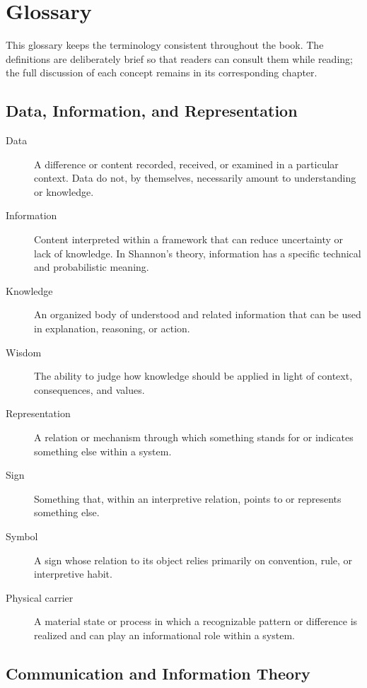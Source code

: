 \chapter*{Glossary}

This glossary keeps the terminology consistent throughout the book. The definitions are deliberately brief so that readers can consult them while reading; the full discussion of each concept remains in its corresponding chapter.

\section*{Data, Information, and Representation}

\begin{description}
  \item[Data] A difference or content recorded, received, or examined in a particular context. Data do not, by themselves, necessarily amount to understanding or knowledge.
  \item[Information] Content interpreted within a framework that can reduce uncertainty or lack of knowledge. In Shannon's theory, information has a specific technical and probabilistic meaning.
  \item[Knowledge] An organized body of understood and related information that can be used in explanation, reasoning, or action.
  \item[Wisdom] The ability to judge how knowledge should be applied in light of context, consequences, and values.
  \item[Representation] A relation or mechanism through which something stands for or indicates something else within a system.
  \item[Sign] Something that, within an interpretive relation, points to or represents something else.
  \item[Symbol] A sign whose relation to its object relies primarily on convention, rule, or interpretive habit.
  \item[Physical carrier] A material state or process in which a recognizable pattern or difference is realized and can play an informational role within a system.
\end{description}

\section*{Communication and Information Theory}

